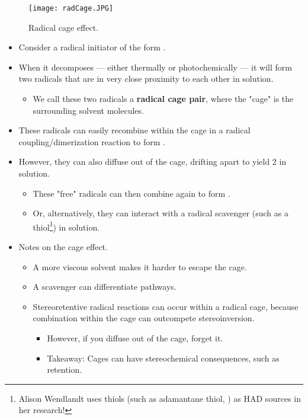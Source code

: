 \documentclass[../notes.tex]{subfiles}
\begin{document}
\begin{itemize}
    \begin{figure}[h!]
        \centering
        \texttt{[image: radCage.JPG]}
        \caption{Radical cage effect.}
        \label{fig:radCage}
    \end{figure}
    \begin{itemize}
        \item Consider a radical initiator of the form .
        \item When it decomposes --- either thermally or photochemically --- it will form two radicals that are in very close proximity to each other in solution.
        \begin{itemize}
            \item We call these two radicals a \textbf{radical cage pair}, where the "cage" is the surrounding solvent molecules.
        \end{itemize}
        \item These radicals can easily recombine within the cage in a radical coupling/dimerization reaction to form .
        \item However, they can also diffuse out of the cage, drifting apart to yield 2  in solution.
        \begin{itemize}
            \item These "free" radicals can then combine again to form .
            \item Or, alternatively, they can interact with a radical scavenger (such as a thiol\footnote{Alison Wendlandt uses thiols (such as adamantane thiol, ) as HAD sources in her research!}) in solution.
        \end{itemize}
        \item Notes on the cage effect.
        \begin{itemize}
            \item A more viscous solvent makes it harder to escape the cage.
            \item A scavenger can differentiate pathways.
            \item Stereoretentive radical reactions can occur within a radical cage, because combination within the cage can outcompete stereoinversion.
            \begin{itemize}
                \item However, if you diffuse out of the cage, forget it.
                \item Takeaway: Cages can have stereochemical consequences, such as retention.

\end{itemize}
\end{itemize}
\end{itemize}
\end{itemize}
\end{document}
